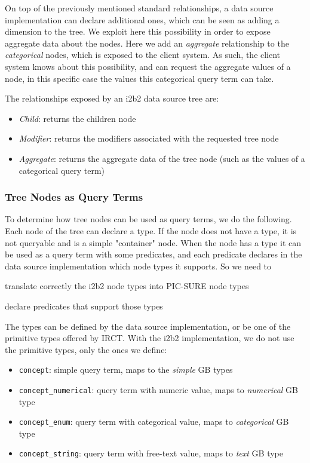 On top of the previously mentioned standard relationships, a data source implementation can declare additional ones, which can be seen as adding a dimension to the tree.
We exploit here this possibility in order to expose aggregate data about the nodes.
Here we add an \emph{aggregate} relationship to the \emph{categorical} nodes, which is exposed to the client system.
As such, the client system knows about this possibility, and can request the aggregate values of a node, in this specific case the values this categorical query term can take.

The relationships exposed by an i2b2 data source tree are:
\begin{itemize}
    \item \emph{Child}: returns the children node 
    \item \emph{Modifier}: returns the modifiers associated with the requested tree node
    \item \emph{Aggregate}: returns the aggregate data of the tree node (such as the values of a categorical query term)
\end{itemize}


\subsubsection{Tree Nodes as Query Terms}

To determine how tree nodes can be used as query terms, we do the following.
Each node of the tree can declare a type. 
If the node does not have a type, it is not queryable and is a simple "container" node.
When the node has a type it can be used as a query term with some predicates, and each predicate declares in the data source implementation which node types it supports.
So we need to 
\begin{enumerate*}
    \item translate correctly the i2b2 node types into PIC-SURE node types
    \item declare predicates that support those types
\end{enumerate*}

The types can be defined by the data source implementation, or be one of the primitive types offered by IRCT.
With the i2b2 implementation, we do not use the primitive types, only the ones we define:
\begin{samepage}
\begin{itemize}
    \item \verb|concept|: simple query term, maps to the \emph{simple} GB types
    \item \verb|concept_numerical|: query term with numeric value, maps to \emph{numerical} GB type
    \item \verb|concept_enum|: query term with categorical value, maps to \emph{categorical} GB type
    \item \verb|concept_string|: query term with free-text value, maps to \emph{text} GB type
\end{itemize}
\end{samepage}

